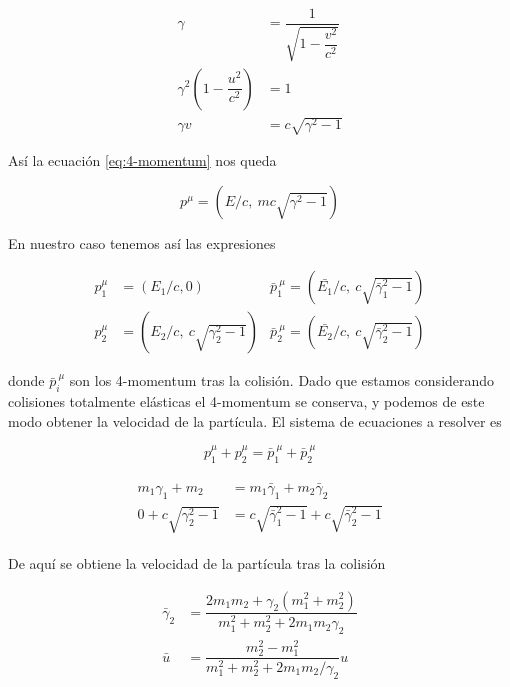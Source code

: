 \begin{align}
    \gamma &= \dfrac{1}{\sqrt{1 - \dfrac{v^2}{c^2}}} \\
    \gamma^2\left( 1 - \dfrac{u^2}{c^2} \right) &= 1 \nonumber \\
    \gamma v &= c\sqrt{\gamma^2 -1}
\end{align}

Así la ecuación \ref{eq:4-momentum} nos queda

\begin{equation}
    p^\mu = \left( E/c, \: mc\sqrt{\gamma^2 -1} \right)
\end{equation}

En nuestro caso tenemos así las expresiones

\begin{align}
    p^\mu_1 &= \left( E_1/c, 0 \right)  &\bar{p}^{\:\mu}_1 = \left( \bar{E_1}/c, \: c\sqrt{\bar{\gamma}^2_1 -1}  \right) \nonumber \\
    p^\mu_2 &= \left( E_2/c, \: c\sqrt{\gamma^2_2 -1} \right)   &\bar{p}^{\:\mu}_2 = \left( \bar{E_2}/c, \: c\sqrt{\bar{\gamma}^2_2 -1}  \right) \nonumber
\end{align}

donde \( \bar{p}^{\:\mu}_i \) son los 4-momentum tras la colisión. Dado que estamos considerando colisiones totalmente elásticas el 4-momentum se conserva, y podemos de este modo obtener la velocidad de la partícula. El sistema de ecuaciones a resolver es

\begin{equation}
    p^\mu_1 + p^\mu_2 = \bar{p}^{\:\mu}_1 + \bar{p}^{\:\mu}_2
\end{equation}

\begin{align}
        \begin{split}
            m_1\gamma_1 + m_2 &= m_1\bar{\gamma}_1 + m_2\bar{\gamma}_2 \\
        0 + c\sqrt{\gamma^2_2 -1} &= c\sqrt{\bar{\gamma}^2_1 -1} + c\sqrt{\bar{\gamma}^2_2 -1}
        \end{split}
\end{align}

De aquí se obtiene la velocidad de la partícula tras la colisión

\begin{align}\label{eq:velocidad_colision_1D}
    \bar{\gamma}_2 &= \dfrac{2 m_1 m_2 + \gamma_2(m_1^2 + m_2^2)}{m_1^2+m_2^2+2 m_1 m_2 \gamma_2} \\[3mm]
    \bar{u} &= \dfrac{m_2^2 - m_1^2}{m_1^2 + m_2^2 + 2 m_1 m_2 / \gamma_2}u
\end{align}

